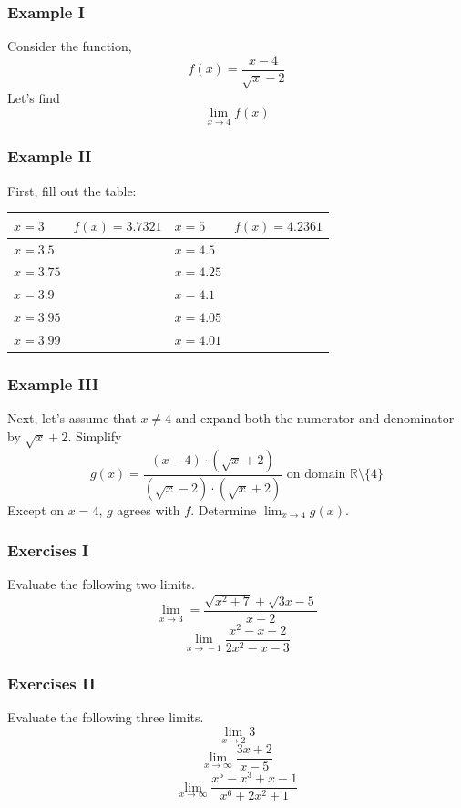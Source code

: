 \documentclass[xcolor=dvipsnames]{beamer}
\begin{document}
\begin{frame}
  \frametitle{Example I}
Consider the function,
\begin{equation}
  \label{eq:shuungae}
  f(x)=\frac{x-4}{\sqrt{x}-2}
\end{equation}
Let's find
\begin{equation}
  \label{eq:ailuiquo}
  \lim_{x\rightarrow{}4}f(x)
\end{equation}
\end{frame}

\begin{frame}
  \frametitle{Example II}
First, fill out the table:

\begin{tabular}{|l|l|l|l|}\hline
  $x=3$ & $f(x)= 3.7321$ & $x=5$ & $f(x)=4.2361$ \\ \hline
  $x=3.5$ & & $x=4.5$ &  \\ \hline
  $x=3.75$ & & $x=4.25$ & \\ \hline
  $x=3.9$ &  & $x=4.1$ & \\ \hline
  $x=3.95$ & & $x=4.05$ & \\ \hline
  $x=3.99$ & & $x=4.01$ & \\ \hline
\end{tabular}
\end{frame}

\begin{frame}
  \frametitle{Example III}
Next, let's assume that $x\neq{}4$ and expand both the numerator
and denominator by $\sqrt{x}+2$. Simplify
\begin{equation}
  \label{eq:oudiolee}
  g(x)=\frac{(x-4)\cdot(\sqrt{x}+2)}{(\sqrt{x}-2)\cdot(\sqrt{x}+2)}\mbox{ on domain }\mathbb{R}\setminus\{4\}
\end{equation}
Except on $x=4$, $g$ agrees with $f$. Determine
$\lim_{x\rightarrow{}4}g(x)$.
\end{frame}

\begin{frame}
  \frametitle{Exercises I}
Evaluate the following two limits.
\begin{equation}
  \label{eq:uheafaix}
  \lim_{x\rightarrow{}3}=\frac{\sqrt{x^{2}+7}+\sqrt{3x-5}}{x+2}
\end{equation}
\begin{equation}
  \label{eq:azeeghee}
  \lim_{x\rightarrow{}-1}\frac{x^{2}-x-2}{2x^{2}-x-3}
\end{equation}
\end{frame}

\begin{frame}
  \frametitle{Exercises II}
Evaluate the following three limits.
\begin{equation}
  \label{eq:haeceema}
  \lim_{x\rightarrow{}2}3
\end{equation}
\begin{equation}
  \label{eq:aogedish}
  \lim_{x\rightarrow\infty}\frac{3x+2}{x-5}
\end{equation}
\begin{equation}
  \label{eq:xaebiaph}
  \lim_{x\rightarrow\infty}\frac{x^{5}-x^{3}+x-1}{x^{6}+2x^{2}+1}
\end{equation}
\end{frame}
\end{document}

